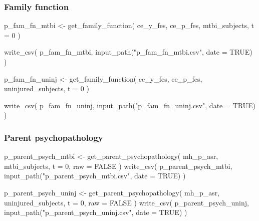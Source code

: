 \documentclass[
  letterpaper,
  DIV=11,
  numbers=noendperiod]{scrreprt}
\newenvironment{Shaded}{\begin{snugshade}}{\end{snugshade}}
\newcommand{\AttributeTok}[1]{\textcolor[rgb]{0.40,0.45,0.13}{#1}}
\newcommand{\ConstantTok}[1]{\textcolor[rgb]{0.56,0.35,0.01}{#1}}
\newcommand{\DecValTok}[1]{\textcolor[rgb]{0.68,0.00,0.00}{#1}}
\newcommand{\FunctionTok}[1]{\textcolor[rgb]{0.28,0.35,0.67}{#1}}
\newcommand{\NormalTok}[1]{\textcolor[rgb]{0.00,0.23,0.31}{#1}}
\newcommand{\OtherTok}[1]{\textcolor[rgb]{0.00,0.23,0.31}{#1}}
\newcommand{\StringTok}[1]{\textcolor[rgb]{0.13,0.47,0.30}{#1}}
\begin{document}
\subsubsection{Family function}\label{family-function}

\begin{Shaded}
\begin{Highlighting}[]
\NormalTok{p\_fam\_fn\_mtbi }\OtherTok{\textless{}{-}} \FunctionTok{get\_family\_function}\NormalTok{(}
\NormalTok{    ce\_y\_fes,}
\NormalTok{    ce\_p\_fes,}
\NormalTok{    mtbi\_subjects,}
    \AttributeTok{t =} \DecValTok{0}
\NormalTok{)}

\FunctionTok{write\_csv}\NormalTok{(}
\NormalTok{    p\_fam\_fn\_mtbi,}
    \FunctionTok{input\_path}\NormalTok{(}\StringTok{"p\_fam\_fn\_mtbi.csv"}\NormalTok{, }\AttributeTok{date =} \ConstantTok{TRUE}\NormalTok{)}
\NormalTok{)}

\NormalTok{p\_fam\_fn\_uninj }\OtherTok{\textless{}{-}} \FunctionTok{get\_family\_function}\NormalTok{(}
\NormalTok{    ce\_y\_fes,}
\NormalTok{    ce\_p\_fes,}
\NormalTok{    uninjured\_subjects,}
    \AttributeTok{t =} \DecValTok{0}
\NormalTok{)}

\FunctionTok{write\_csv}\NormalTok{(}
\NormalTok{    p\_fam\_fn\_uninj,}
    \FunctionTok{input\_path}\NormalTok{(}\StringTok{"p\_fam\_fn\_uninj.csv"}\NormalTok{, }\AttributeTok{date =} \ConstantTok{TRUE}\NormalTok{)}
\NormalTok{)}
\end{Highlighting}
\end{Shaded}

\subsubsection{Parent psychopathology}\label{parent-psychopathology}

\begin{Shaded}
\begin{Highlighting}[]
\NormalTok{p\_parent\_psych\_mtbi }\OtherTok{\textless{}{-}} \FunctionTok{get\_parent\_psychopathology}\NormalTok{(}
\NormalTok{    mh\_p\_asr,}
\NormalTok{    mtbi\_subjects,}
    \AttributeTok{t =} \DecValTok{0}\NormalTok{,}
    \AttributeTok{raw =} \ConstantTok{FALSE}
\NormalTok{)}
\FunctionTok{write\_csv}\NormalTok{(}
\NormalTok{    p\_parent\_psych\_mtbi,}
    \FunctionTok{input\_path}\NormalTok{(}\StringTok{"p\_parent\_psych\_mtbi.csv"}\NormalTok{, }\AttributeTok{date =} \ConstantTok{TRUE}\NormalTok{)}
\NormalTok{)}

\NormalTok{p\_parent\_psych\_uninj }\OtherTok{\textless{}{-}} \FunctionTok{get\_parent\_psychopathology}\NormalTok{(}
\NormalTok{    mh\_p\_asr,}
\NormalTok{    uninjured\_subjects,}
    \AttributeTok{t =} \DecValTok{0}\NormalTok{,}
    \AttributeTok{raw =} \ConstantTok{FALSE}
\NormalTok{)}
\FunctionTok{write\_csv}\NormalTok{(}
\NormalTok{    p\_parent\_psych\_uninj, }\FunctionTok{input\_path}\NormalTok{(}\StringTok{"p\_parent\_psych\_uninj.csv"}\NormalTok{, }\AttributeTok{date =} \ConstantTok{TRUE}\NormalTok{)}
\NormalTok{)}
\end{Highlighting}
\end{Shaded}
\end{document}
